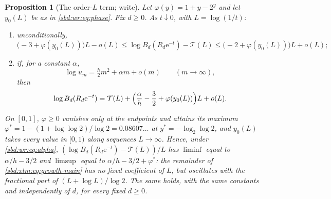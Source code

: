 \documentclass[11pt,a4paper]{article}
\newtheorem{proposition}[theorem]{Proposition}
\theoremstyle{definition}
\newcommand{\e}{\mathrm e}
\begin{document}
\begin{proposition}[The order-$L$ term; write]\label{sbd:wr:prop:orderL}
Let $\varphi(y)=1+y-2^y$ and let $y_0(L)$ be as in \eqref{sbd:wr:eq:phase}.
Fix $d\ge0$. As $t\downarrow0$, with $L=\log(1/t)$:
\begin{enumerate}[label=(\roman*)]
\item unconditionally,
\begin{equation}\label{sbd:wr:eq:orderL-bounds}
 \bigl(-3+\varphi(y_0(L))\bigr)L-o(L)\le
 \log B_d(R_d\e^{-t})-\mathcal T(L)\le
 \bigl(-2+\varphi(y_0(L))\bigr)L+o(L);
\end{equation}
\item if, for a constant $\alpha$,
\begin{equation}\label{sbd:wr:eq:alpha}
 \log u_m=\tfrac h2m^2+\alpha m+o(m)\qquad(m\to\infty),
\end{equation}
then
\begin{equation}\label{sbd:wr:eq:orderL}
 \log B_d(R_d\e^{-t})=\mathcal T(L)
 +\Bigl(\frac\alpha h-\frac32+\varphi(y_0(L))\Bigr)L+o(L).
\end{equation}
\end{enumerate}
On $[0,1]$, $\varphi\ge0$ vanishes only at the endpoints and attains its
maximum $\varphi^*=1-(1+\log\log2)/\log2=0.08607\ldots$ at
$y^*=-\log_2\log2$, and $y_0(L)$ takes every value in $[0,1)$ along sequences
$L\to\infty$. Hence, under \eqref{sbd:wr:eq:alpha}, $(\log
B_d(R_d\e^{-t})-\mathcal T(L))/L$ has $\liminf$ equal to $\alpha/h-3/2$ and
$\limsup$ equal to $\alpha/h-3/2+\varphi^*$: the remainder of
\eqref{sbd:xtm:eq:growth-main} has no fixed coefficient of $L$, but
oscillates with the fractional part of $(L+\log L)/\log2$. The same holds,
with the same constants and independently of $d$, for every fixed $d\ge0$.
\end{proposition}
\end{document}
